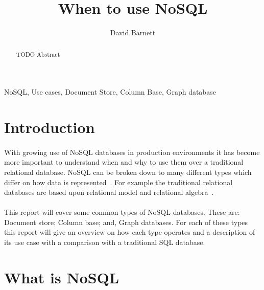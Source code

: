 \documentclass{CRPITStyle}
\renewcommand{\cite}{\citep}
\begin{document}
\title{When to use NoSQL}
\author{David Barnett}

\maketitle

\begin{abstract}
    TODO Abstract
\end{abstract}

\vspace{.1in}

 NoSQL, Use cases, Document Store, Column Base, Graph database

\section{Introduction}

\paragraph{}
With growing use of NoSQL databases in production environments it has become more
important to understand when and why to use them over a traditional
relational database.
NoSQL can be broken down to many different types which differ on how
data is represented~\cite{type_nosql}.
For example the traditional relational databases are based upon relational
model and relational algebra~\cite{relational_db}.

\paragraph{}
This report will cover some common types of NoSQL databases.
These are: Document store; Column base; and, Graph databases.
For each of these types this report will give an overview on how each type
operates and a description of its use case with a comparison with a
traditional SQL database.

\cite{whats_new}
\cite{sql_nosql_gap}
\cite{scalable_sql}

\section{What is NoSQL}
\end{document}
